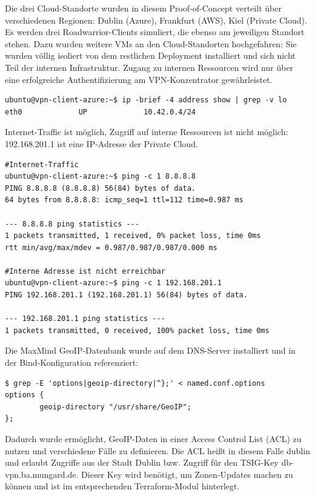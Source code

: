 Die drei Cloud-Standorte wurden in diesem Proof-of-Concept verteilt über verschiedenen Regionen: Dublin (Azure), Frankfurt (AWS), Kiel (Private Cloud). Es werden drei Roadwarrior-Clients simuliert, die ebenso am jeweiligen Standort stehen. Dazu wurden weitere VMs an den Cloud-Standorten hochgefahren: Sie wurden völlig isoliert von dem restlichen Deployment installiert und sich nicht Teil der internen Infrastruktur. Zugang zu internen Ressourcen wird nur über eine erfolgreiche Authentifizierung am VPN-Konzentrator gewährleistet.

\begin{lstlisting}[label=ext-ip-addr-roadwarrior,caption=Der simulierte Roadwarrior-Client ist nicht Teil der Netzwerke 10.32.0.0/16 bzw. 10.33.0.0/16]
ubuntu@vpn-client-azure:~$ ip -brief -4 address show | grep -v lo
eth0             UP             10.42.0.4/24
\end{lstlisting}

Internet-Traffic ist möglich, Zugriff auf interne Ressourcen ist nicht möglich: 192.168.201.1 ist eine IP-Adresse der Private Cloud.

\begin{lstlisting}[label=internet-access-roadwarrior,caption=Der Roadwarrior-Client kann auf das Internet zugreifen - kein Zugriff auf interne Ressourcen.]
#Internet-Traffic
ubuntu@vpn-client-azure:~$ ping -c 1 8.8.8.8
PING 8.8.8.8 (8.8.8.8) 56(84) bytes of data.
64 bytes from 8.8.8.8: icmp_seq=1 ttl=112 time=0.987 ms

--- 8.8.8.8 ping statistics ---
1 packets transmitted, 1 received, 0% packet loss, time 0ms
rtt min/avg/max/mdev = 0.987/0.987/0.987/0.000 ms

#Interne Adresse ist nicht erreichbar 
ubuntu@vpn-client-azure:~$ ping -c 1 192.168.201.1
PING 192.168.201.1 (192.168.201.1) 56(84) bytes of data.

--- 192.168.201.1 ping statistics ---
1 packets transmitted, 0 received, 100% packet loss, time 0ms
\end{lstlisting}

Die MaxMind GeoIP-Datenbank wurde auf dem DNS-Server installiert und in der Bind-Konfiguration referenziert:

\begin{lstlisting}[label=bind-geoip-directory,caption=.]
$ grep -E 'options|geoip-directory|^};' < named.conf.options
options {
        geoip-directory "/usr/share/GeoIP";
};
\end{lstlisting}

Dadurch wurde ermöglicht, GeoIP-Daten in einer Access Control List (ACL) zu nutzen und verschiedene Fälle zu definieren. Die ACL heißt in diesem Falle \glqq dublin\grqq{} und erlaubt Zugriffe aus der Stadt Dublin bzw. Zugriff für den TSIG-Key db-vpn.ba.mungard.de. Dieser Key wird benötigt, um Zonen-Updates machen zu können und ist im entsprechenden Terraform-Modul hinterlegt.

